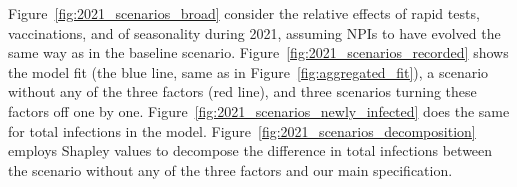 Figure~\ref{fig:2021_scenarios_broad} consider the relative effects of rapid tests,
vaccinations, and of seasonality during 2021, assuming NPIs to have evolved the same way
as in the baseline scenario. Figure~\ref{fig:2021_scenarios_recorded} shows the model
fit (the blue line, same as in Figure~\ref{fig:aggregated_fit}), a scenario without any
of the three factors (red line), and three scenarios turning these factors off one by
one. Figure~\ref{fig:2021_scenarios_newly_infected} does the same for total infections
in the model. Figure~\ref{fig:2021_scenarios_decomposition} employs Shapley values to
decompose the difference in total infections between the scenario without any of the
three factors and our main specification.

\begin{figure}[!tp]
    \centering


\end{figure}
